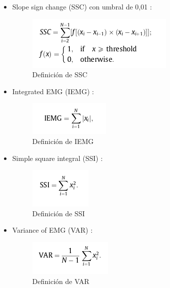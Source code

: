 \begin{itemize}
\item Slope sign change (SSC) con umbral de 0,01 \cite{phinyomark2012feature}:
    \begin{figure}[ht]
        \centering
        \includegraphics[scale=0.8]{imagenes/formula de caracteristicas/ssc.png}
        \caption{ Definición de SSC \cite{phinyomark2012feature}}
        \label{fig:ssc1}
    \end{figure}
   
\item Integrated EMG (IEMG) \cite{phinyomark2012feature}:
    \begin{figure}[!ht]
        \centering
        \includegraphics[scale=0.8]{imagenes/formula de caracteristicas/iemg.png}
        \caption{ Definición de IEMG \cite{phinyomark2012feature}}
        \label{fig:iemg1}
    \end{figure}
\newpage
\item Simple square integral (SSI) \cite{phinyomark2012feature}:
    \begin{figure}[!ht]
        \centering
        \includegraphics[scale=0.8]{imagenes/formula de caracteristicas/ssi.png}
        \caption{ Definición de SSI \cite{phinyomark2012feature}}
        \label{fig:ssi1}
    \end{figure}
    

\item Variance of EMG (VAR) \cite{phinyomark2012feature}:
    \begin{figure}[ht]
        \centering
        \includegraphics[scale=0.8]{imagenes/formula de caracteristicas/var.png}
        \caption{ Definición de VAR \cite{phinyomark2012feature}}
        \label{fig:var1}
    \end{figure}
    

\end{itemize}
